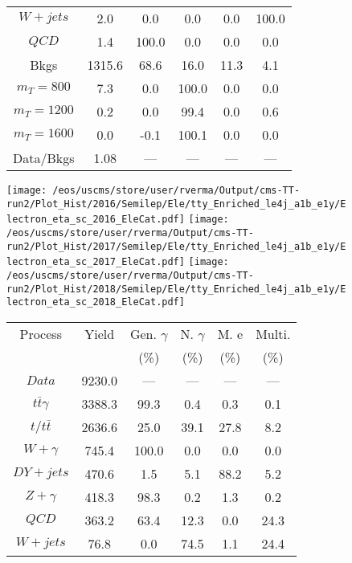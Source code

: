 \begin{figure}
\begin{minipage}[c]{0.32\textwidth}
{\begin{tabular}{cccccc}
$ W+jets $ &  2.0 &  0.0 &  0.0 &  0.0 &  100.0\\
$ QCD $ &  1.4 &  100.0 &  0.0 &  0.0 &  0.0\\
Bkgs &  1315.6 &  68.6 &  16.0 &  11.3 &  4.1\\
$ m_{T} = 800 $ &  7.3 &  0.0 &  100.0 &  0.0 &  0.0\\
$ m_{T} = 1200 $ &  0.2 &  0.0 &  99.4 &  0.0 &  0.6\\
$ m_{T} = 1600 $ &  0.0 &  -0.1 &  100.1 &  0.0 &  0.0\\
Data/Bkgs &  1.08 &  --- &  --- &  --- &  ---\\
\hline
\end{tabular}
}
\end{minipage}
\end{figure}

\begin{figure}
\centering
\texttt{[image: /eos/uscms/store/user/rverma/Output/cms-TT-run2/Plot\_Hist/2016/Semilep/Ele/tty\_Enriched\_le4j\_a1b\_e1y/Electron\_eta\_sc\_2016\_EleCat.pdf]}
\texttt{[image: /eos/uscms/store/user/rverma/Output/cms-TT-run2/Plot\_Hist/2017/Semilep/Ele/tty\_Enriched\_le4j\_a1b\_e1y/Electron\_eta\_sc\_2017\_EleCat.pdf]}
\texttt{[image: /eos/uscms/store/user/rverma/Output/cms-TT-run2/Plot\_Hist/2018/Semilep/Ele/tty\_Enriched\_le4j\_a1b\_e1y/Electron\_eta\_sc\_2018\_EleCat.pdf]}
\begin{minipage}[c]{0.32\textwidth}
\centering
\tiny{
\begin{tabular}{cccccc}
\hline
Process & Yield & Gen. $\gamma$ & N. $\gamma$ & M. e & Multi. \\
 &  & (\%) & (\%) & (\%) & (\%)  \\
\hline
                                                                      $ Data $ &  9230.0 &  --- &  --- &  --- &  ---\\
$ t\bar{t}\gamma $ &  3388.3 &  99.3 &  0.4 &  0.3 &  0.1\\
$ t/t\bar{t} $ &  2636.6 &  25.0 &  39.1 &  27.8 &  8.2\\
$ W+\gamma $ &  745.4 &  100.0 &  0.0 &  0.0 &  0.0\\
$ DY+jets $ &  470.6 &  1.5 &  5.1 &  88.2 &  5.2\\
$ Z+\gamma $ &  418.3 &  98.3 &  0.2 &  1.3 &  0.2\\
$ QCD $ &  363.2 &  63.4 &  12.3 &  0.0 &  24.3\\
$ W+jets $ &  76.8 &  0.0 &  74.5 &  1.1 &  24.4\\

\end{tabular}}
\end{minipage}
\end{figure}
